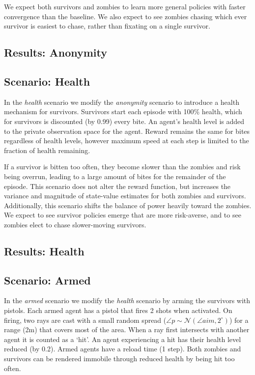\documentclass[11pt,a4paper]{article}
\begin{document}
We expect both survivors and zombies to learn more general policies with faster convergence than the baseline.
We also expect to see zombies chasing which ever survivor is easiest to chase, rather than fixating on a single survivor.

\subsection{Results: Anonymity}



\subsection{Scenario: Health}
\label{sec:health}

In the \emph{health} scenario we modify the \emph{anonymity} scenario to introduce a health mechanism for survivors.
Survivors start each episode with 100\% health, which for survivors is discounted (by 0.99) every bite.
An agent's health level is added to the private observation space for the agent.
Reward remains the same for bites regardless of health levels,
however maximum speed at each step is limited to the fraction of health remaining.

If a survivor is bitten too often, they become slower than the zombies and risk being overrun, leading to a large amount of bites for the remainder of the episode.
This scenario does not alter the reward function, but increases the variance and magnitude of state-value estimates for both zombies and survivors.
Additionally, this scenario shifts the balance of power heavily toward the zombies.
We expect to see survivor policies emerge that are more risk-averse, and to see zombies elect to chase slower-moving survivors.

\subsection{Results: Health}

\subsection{Scenario: Armed}
\label{sec:arms}

In the \emph{armed} scenario we modify the \emph{health} scenario by arming the survivors with pistols.
Each armed agent has a pistol that fires 2 shots when activated.
On firing, two rays are cast with a small random spread ($\angle p \sim \mathcal{N}(\angle aim, 2^\circ)$) for a range (2m) that covers most of the area.
When a ray first intersects with another agent it is counted as a `hit'.
An agent experiencing a hit has their health level reduced (by 0.2).
Armed agents have a reload time (1 step).
Both zombies and survivors can be rendered immobile through reduced health by being hit too often.
\end{document}
